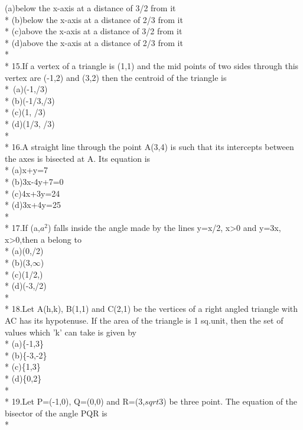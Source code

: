 \documentclass{article}
\begin{document}
{(a)\enspace below the x-axis at a distance of 3/2 from it\\*
(b)\enspace below the x-axis at a distance of 2/3 from it\\*
(c)\enspace above the x-axis at a distance of 3/2 from it\\*
(d)\enspace above the x-axis at a distance of 2/3 from it\\*\\*
15.\enspace If a vertex of a triangle is (1,1) and the mid points of two sides through this vertex are (-1,2) and (3,2) then the centroid of the triangle is\\*\
(a)\enspace (-1,/3) \\*
(b)\enspace (-1/3,/3) \\*
(c)\enspace (1, /3)\\*
(d)\enspace (1/3, \enspace 7/3)\\*\\*
16.\enspace A straight line through the point A(3,4) is such that its intercepts between the axes is bisected at A. Its equation is\\*
(a)\enspace x+y=7\\*
(b)\enspace 3x-4y+7=0\\*
(c)\enspace 4x+3y=24\\*
(d)\enspace 3x+4y=25\\*\\*
17.\enspace If (a,$a^2$) falls inside the angle made by the lines y=x/2, x>0 and y=3x, x>0,then a belong to\\*
(a)\enspace (0,\enspace1/2)\\*
(b)\enspace (3,\enspace$\infty$)\\*
(c)\enspace (1/2,)\\*
(d)\enspace (-3,/2)\\*\\*
18.\enspace Let A(h,k), B(1,1) and  C(2,1) be the vertices of a right angled triangle with AC has its hypotenuse. If the area of the triangle is 1 sq.unit, then the set of values which 'k' can take is given by\\*
(a)\enspace \{-1,3\}\\*
(b)\enspace \{-3,-2\}\\*
(c)\enspace \{1,3\}\\*
(d)\enspace \{0,2\}\\*\\*
19.\enspace Let P=(-1,0), Q=(0,0) and R=(3,$sqrt3$) be three point. The equation of the bisector of the angle PQR is \\*
}
\end{document}
